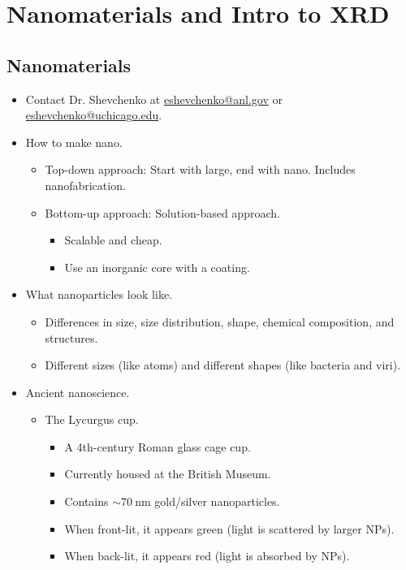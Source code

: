 \documentclass[../notes.tex]{subfiles}
\begin{document}
\chapter{Nanomaterials and Intro to XRD}
\section{Nanomaterials}
\begin{itemize}
    \item {}Contact Dr. Shevchenko at \href{mailto:eshevchenko@anl.gov}{eshevchenko@anl.gov} or \href{mailto:eshevchenko@uchicago.edu}{eshevchenko@uchicago.edu}.
    \item How to make nano.
    \begin{itemize}
        \item Top-down approach: Start with large, end with nano. Includes nanofabrication.
        \item Bottom-up approach: Solution-based approach.
        \begin{itemize}
            \item Scalable and cheap.
            \item Use an inorganic core with a coating.
        \end{itemize}
    \end{itemize}
    \item What nanoparticles look like.
    \begin{itemize}
        \item Differences in size, size distribution, shape, chemical composition, and structures.
        \item Different sizes (like atoms) and different shapes (like bacteria and viri).
    \end{itemize}
    \item Ancient nanoscience.
    \begin{itemize}
        \item The Lycurgus cup.
        \begin{itemize}
            \item A 4th-century Roman glass cage cup.
            \item Currently housed at the British Museum.
            \item Contains $\sim\SI{70}{\nano\meter}$ gold/silver nanoparticles.
            \item When front-lit, it appears green (light is scattered by larger NPs).
            \item When back-lit, it appears red (light is absorbed by NPs).

\end{itemize}
\end{itemize}
\end{itemize}
\end{document}
